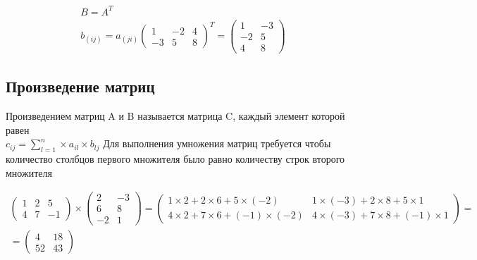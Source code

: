 \documentclass[a4paper, 11pt, oneside]{article}
\begin{document}
\begin{gather*}
	B = A^T\\
	b_(ij) = a_(ji)
	\begin{pmatrix}
		1&-2&4\\
		-3&5&8
	\end{pmatrix}
	^T
	=
	\begin{pmatrix}
		1&-3\\
		-2&5\\
		4&8
	\end{pmatrix}
\end{gather*}

\subsection{Произведение матриц} %

Произведением матриц A и B называется матрица C, каждый элемент которой равен\\
$c_{ij} = \sum\limits_{l=1}^n \times a_{il} \times b_{lj}$
Для выполнения умножения матриц требуется чтобы количество столбцов первого множителя было равно количеству строк второго множителя

\begin{gather*}
	\begin{pmatrix}
		1& 2& 5\\
		4& 7& -1
	\end{pmatrix}
	\times
	\begin{pmatrix}
		2& -3\\
		6& 8\\
		-2& 1
	\end{pmatrix}
	=
	\begin{pmatrix}
		1\times 2+2\times 6+5\times (-2)& 1\times (-3)+2\times 8+5\times 1\\
		4\times 2+7\times 6+(-1)\times (-2)& 4\times (-3)+7\times 8+(-1)\times 1
	\end{pmatrix}
	=\\=
	\begin{pmatrix}
		4& 18\\
		52& 43
	\end{pmatrix}
\end{gather*}
\end{document}
